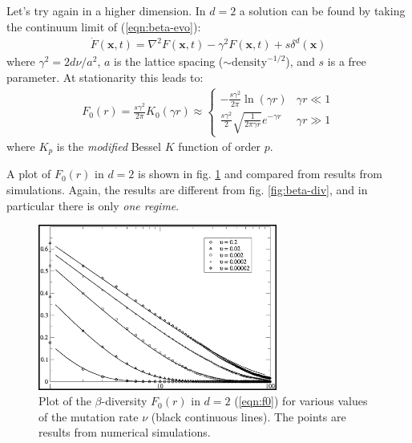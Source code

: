 \documentclass[../../main.tex]{subfiles}
\begin{document}
Let's try again in a higher dimension. In $d=2$ a solution can be found by taking the continuum limit of (\ref{eqn:beta-evo}):
\begin{align*}
    \dot{F}(\bm{x},t) = \nabla^2 F(\bm{x},t) - \gamma^2 F(\bm{x},t) + s \delta^d(\bm{x})
\end{align*}
where $\gamma^2 = 2d \nu/a^2$, $a$ is the lattice spacing ($\sim \mathrm{density}^{-1/2}$), and $s$ is a free parameter. At stationarity this leads to:
\begin{align}\label{eqn:f0}
    F_0(r) = \frac{s \gamma^2}{2 \pi} K_0(\gamma r) \approx \begin{cases}
        - \frac{s \gamma^2}{2 \pi} \ln (\gamma r) & \gamma r \ll 1\\
        \frac{s \gamma^2}{2} \sqrt{\frac{1}{2 \pi \gamma r} }   e^{-\gamma r} & \gamma r \gg 1
    \end{cases} 
\end{align}
where $K_p$ is the \textit{modified} Bessel $K$ function of order $p$. 

A plot of $F_0(r)$ in $d=2$ is shown in fig. \ref{fig:beta-2} and compared from results from simulations. Again, the results are different from fig. \ref{fig:beta-div}, and in particular there is only \textit{one regime}. 

\begin{figure}[H]
    \centering
    \includegraphics[width=0.7\textwidth]{beta-2.png}
    \caption{Plot of the $\beta$-diversity $F_0(r)$ in $d=2$ (\ref{eqn:f0}) for various values of the mutation rate $\nu$ (black continuous lines). The points are results from numerical simulations.}
    \label{fig:beta-2}
\end{figure}
\end{document}
